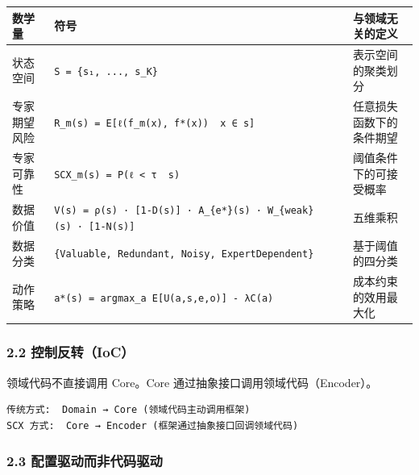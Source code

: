 \documentclass[
  12pt,
]{ctexart}
\begin{document}
\begin{longtable}[]{@{}
  >{\raggedright\arraybackslash}p{}
  >{\raggedright\arraybackslash}p{}
  >{\raggedright\arraybackslash}p{}@{}}
\toprule\noalign{}
\begin{minipage}[b]{\linewidth}\raggedright
数学量
\end{minipage} & \begin{minipage}[b]{\linewidth}\raggedright
符号
\end{minipage} & \begin{minipage}[b]{\linewidth}\raggedright
与领域无关的定义
\end{minipage} \\
\midrule\noalign{}
\endhead
\bottomrule\noalign{}
\endlastfoot
状态空间 & \texttt{S\ =\ \{s₁,\ ...,\ s\_K\}} & 表示空间的聚类划分 \\
专家期望风险 &
\texttt{R\_m(s)\ =\ E{[}ℓ(f\_m(x),\ f*(x))\ \textbar{}\ x\ ∈\ s{]}} &
任意损失函数下的条件期望 \\
专家可靠性 & \texttt{SCX\_m(s)\ =\ P(ℓ\ \textless{}\ τ\ \textbar{}\ s)}
& 阈值条件下的可接受概率 \\
数据价值 &
\texttt{V(s)\ =\ ρ(s)\ ·\ {[}1-D(s){]}\ ·\ A\_\{e*\}(s)\ ·\ W\_\{weak\}(s)\ ·\ {[}1-N(s){]}}
& 五维乘积 \\
数据分类 & \texttt{\{Valuable,\ Redundant,\ Noisy,\ ExpertDependent\}} &
基于阈值的四分类 \\
动作策略 & \texttt{a*(s)\ =\ argmax\_a\ E{[}U(a,s,e,o){]}\ -\ λC(a)} &
成本约束的效用最大化 \\
\end{longtable}

\subsubsection{2.2 控制反转（IoC）}\label{ux63a7ux5236ux53cdux8f6cioc}

领域代码不直接调用 Core。Core 通过抽象接口调用领域代码（Encoder）。

\begin{verbatim}
传统方式:  Domain → Core (领域代码主动调用框架)
SCX 方式:  Core → Encoder (框架通过抽象接口回调领域代码)
\end{verbatim}

\subsubsection{2.3
配置驱动而非代码驱动}\label{ux914dux7f6eux9a71ux52a8ux800cux975eux4ee3ux7801ux9a71ux52a8}
\end{document}
